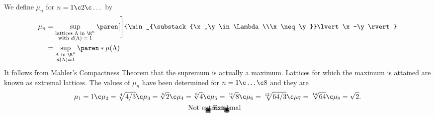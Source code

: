 We define $\mu_n$ for $n=1\c 2\c \dotsc$ by
\begin{align*}
\mu_n &= \sup_{\substack{\text{lattices $\Lambda$ in $\R^n$}\\\text{with $d(\Lambda)=1$}}}\paren[\Bigg]{\min_{\substack{\x,\y\in\Lambda\\\x\neq\y}}\lvert\x-\y\rvert} \\
&= \sup_{\substack{\text{$\Lambda$ in $\R^n$}\\d(\Lambda)=1}}\paren*{\mu(\Lambda)} 
\end{align*}
It follows from Mahler's Compactness Theorem that the supremum is actually a maximum.  Lattices for which the maximum is attained are known as extremal lattices.  The values of $\mu_n$ have been determined for $n=1\c \dotsc\c 8$ and they are
\[ \mu_1 = 1\c  \mu_2 = \sqrt[4]{4/3}\c  \mu_3 = \sqrt[6]{2}\c  \mu_4 = \sqrt[8]{4}\c  \mu_5 = \sqrt[10]{8}\c  \mu_6 = \sqrt[12]{64/3}\c  \mu_7 = \sqrt[14]{64}\c  \mu_8 = \sqrt{2} . \]
\[ \begin{picture}(7,7.75)(-3.5,-3.5)
\put(-3.5,0){\vector(1,0){7}}
\put(0,-3.5){\vector(0,1){7}}
\multiput(-3,3)(1,0){7}{\circle*{0.1}}
\multiput(-3,2)(1,0){7}{\circle*{0.1}}
\multiput(-3,1)(1,0){7}{\circle*{0.1}}
\multiput(-3,0)(1,0){7}{\circle*{0.1}}
\multiput(-3,-1)(1,0){7}{\circle*{0.1}}
\multiput(-3,-2)(1,0){7}{\circle*{0.1}}
\multiput(-3,-3)(1,0){7}{\circle*{0.1}}
\put(0,4){\makebox(0,0){Not extremal}}
\end{picture}
\qquad
\begin{picture}(7,7.75)(-3.5,-3.5)
\put(-3.5,0){\vector(1,0){7}}
\put(0,-3.5){\vector(0,1){7}}
\put(0,0){\circle*{0.1}}
\multiput(-3.224,0)(1.075,0){7}{\circle*{0.1}}
\multiput(-3.224,1.861)(1.075,0){7}{\circle*{0.1}}
\multiput(-3.224,-1.861)(1.075,0){7}{\circle*{0.1}}
\multiput(-2.686,0.931)(1.075,0){6}{\circle*{0.1}}
\multiput(-2.686,-0.931)(1.075,0){6}{\circle*{0.1}}
\multiput(-2.686,2.792)(1.075,0){6}{\circle*{0.1}}
\multiput(-2.686,-2.792)(1.075,0){6}{\circle*{0.1}}
\put(0,4){\makebox(0,0){Extremal}}
\end{picture} \]
\vspace{-\baselineskip}

